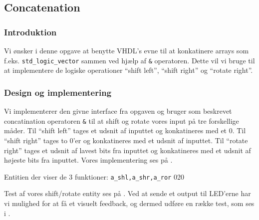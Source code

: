 

\subsection{Concatenation}

\subsubsection{Introduktion}
Vi ønsker i denne opgave at benytte VHDL's evne til at konkatinere arrays som f.eks. \texttt{std\_logic\_vector} sammen ved hjælp af \texttt{\&} operatoren.
Dette vil vi bruge til at implementere de logiske operationer ``shift left'', ``shift right'' og ``rotate right''.

\subsubsection{Design og implementering}

Vi implementerer den givne interface fra opgaven og bruger som beskrevet concatination operatoren \texttt{\&} til at shift og rotate vores input på tre forskellige måder.
Til ``shift left'' tages et udsnit af inputtet og konkatineres med et 0.
Til ``shift right'' tages to 0'er og konkatineres med et udsnit af inputtet.
Til ``rotate right'' tages et udsnit af lavest bits fra inputtet og konkatineres med et udsnit af højeste bits fra inputtet.
Vores implementering ses på .

{Entitien der viser de 3 funktioner: \texttt{a\_shl,a\_shr,a\_ror}}
{0}{20}


Test af vores shift/rotate entity ses på .
Ved at sende et output til LED'erne har vi mulighed for at få et visuelt feedback, og dermed udføre en række test, som ses i .


